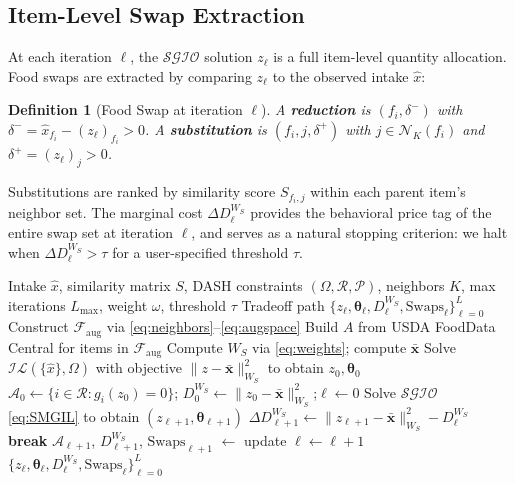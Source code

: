 \documentclass[journal]{IEEEtran}
\newtheorem{definition}{Definition}
\newcommand{\IL}{\mathcal{IL}}
\newcommand{\SGIO}{\mathcal{SGIO}}
\newcommand{\Faug}{\mathcal{F}_{\mathrm{aug}}}
\newcommand{\Nb}{\mathcal{N}}
\newcommand{\btheta}{\boldsymbol{\theta}}
\newcommand{\bW}{W_S}
\newcommand{\xbar}{\bar{\mathbf{x}}}
\newcommand{\cR}{\mathcal{R}}
\newcommand{\cP}{\mathcal{P}}
\newcommand{\cA}{\mathcal{A}}
\begin{document}
\subsection{Item-Level Swap Extraction}
\label{subsec:swaps}

At each iteration $\ell$, the $\SGIO$ solution $z_\ell$ is a full
item-level quantity allocation. Food swaps are extracted by comparing
$z_\ell$ to the observed intake $\hat{x}$:

\begin{definition}[Food Swap at iteration $\ell$]
A \textbf{reduction} is $(f_i, \delta^-)$ with $\delta^- =
\hat{x}_{f_i} - (z_\ell)_{f_i} > 0$. A \textbf{substitution} is
$(f_i, j, \delta^+)$ with $j \in \Nb_K(f_i)$ and
$\delta^+ = (z_\ell)_j > 0$.
\end{definition}

Substitutions are ranked by similarity score $S_{f_i, j}$ within each
parent item's neighbor set. The marginal cost $\Delta D^{\bW}_\ell$
provides the behavioral price tag of the entire swap set at iteration
$\ell$, and serves as a natural stopping criterion: we halt when
$\Delta D^{\bW}_\ell > \tau$ for a user-specified threshold $\tau$.

\begin{algorithm}[t]
\caption{Similarity-Guided Inverse Optimization (SGIO)}
\label{alg:SMGIL}
\begin{algorithmic}[1]
\REQUIRE Intake $\hat{x}$, similarity matrix $S$, DASH
constraints $(\Omega, \cR, \cP)$, neighbors $K$, max iterations
$L_{\max}$, weight $\omega$, threshold $\tau$
\ENSURE Tradeoff path
$\{z_\ell, \btheta_\ell, D^{\bW}_\ell, \text{Swaps}_\ell\}_{\ell=0}^L$
\STATE Construct $\Faug$ via \eqref{eq:neighbors}--\eqref{eq:augspace}
\STATE Build $A$ from USDA FoodData Central for items in $\Faug$
\STATE Compute $\bW$ via \eqref{eq:weights}; compute $\xbar$
\STATE Solve $\IL(\{\hat{x}\}, \Omega)$ with objective
       $\|z-\xbar\|_{\bW}^2$ to obtain $z_0, \btheta_0$
\STATE $\cA_0 \leftarrow \{i \in \cR : g_i(z_0)=0\}$;\quad
       $D^{\bW}_0 \leftarrow \|z_0-\xbar\|_{\bW}^2$;\quad $\ell \leftarrow 0$
\WHILE{$\ell < L_{\max}$ \AND $|\cA_\ell| < |\cR|$}
    \STATE Solve $\SGIO$ \eqref{eq:SMGIL} to obtain $(z_{\ell+1},\btheta_{\ell+1})$
    \STATE $\Delta D^{\bW}_{\ell+1} \leftarrow
           \|z_{\ell+1}-\xbar\|_{\bW}^2 - D^{\bW}_\ell$
    \IF{$\Delta D^{\bW}_{\ell+1} > \tau$}
        \STATE \textbf{break}
    \ENDIF
    \STATE $\cA_{\ell+1}$, $D^{\bW}_{\ell+1}$, $\text{Swaps}_{\ell+1}$
           $\leftarrow$ update
    \STATE $\ell \leftarrow \ell + 1$
\ENDWHILE
\RETURN $\{z_\ell, \btheta_\ell, D^{\bW}_\ell, \text{Swaps}_\ell\}_{\ell=0}^L$
\end{algorithmic}
\end{algorithm}
\end{document}
